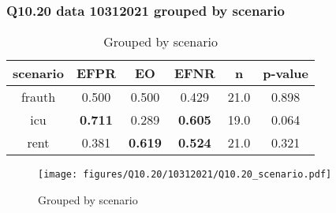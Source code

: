 \subsubsection{Q10.20 data 10312021 grouped by scenario}

\begin{comment}
               EFPR        EO      EFNR     n    pvalue
(frauth,)  0.500000  0.500000  0.428571  21.0  0.898120
(icu,)     0.710526  0.289474  0.605263  19.0  0.063683
(rent,)    0.380952  0.619048  0.523810  21.0  0.321277
\end{comment}

\begin{table}[h]
    \centering
    \begin{tabular}{|c|c|c|c|c|c|}
        \hline
        scenario & EFPR & EO & EFNR & n & p-value\\
        \hline
        frauth & 0.500 & 0.500 & 0.429 & 21.0 & 0.898\\
		icu & \textbf{0.711} & 0.289 & \textbf{0.605} & 19.0 & 0.064\\
		rent & 0.381 & \textbf{0.619} & \textbf{0.524} & 21.0 & 0.321\\
		
        \hline
    \end{tabular}
    \caption{Grouped by scenario}
    \label{tab:my_label}
\end{table}
\begin{figure}[h]
    \centering
    \texttt{[image: figures/Q10.20/10312021/Q10.20\_scenario.pdf]}
    \caption{Grouped by scenario}
    \label{fig:my_label}
\end{figure}
